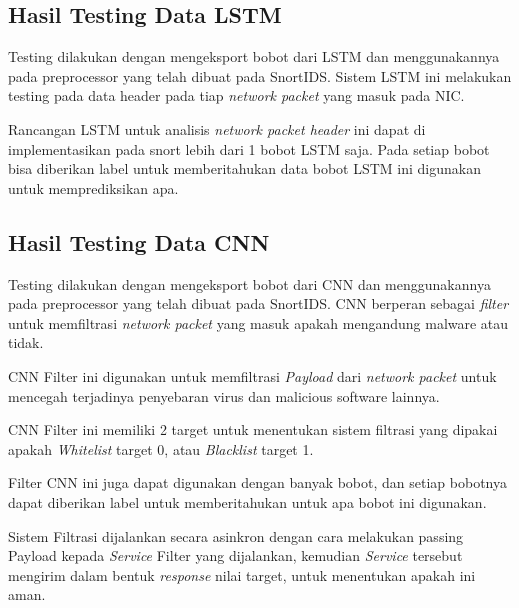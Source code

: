 \documentclass[./skripsi.tex]{subfiles}
\begin{document}
\subsection{Hasil Testing Data LSTM}
\par Testing dilakukan dengan mengeksport bobot dari LSTM dan menggunakannya pada preprocessor yang telah dibuat pada SnortIDS.
Sistem LSTM ini melakukan testing pada data header pada tiap \textit{network packet} yang masuk pada NIC.
\par Rancangan LSTM untuk analisis \textit{network packet header} ini dapat di implementasikan pada snort lebih dari 1 bobot LSTM saja. Pada setiap bobot bisa diberikan label untuk memberitahukan data bobot LSTM ini digunakan untuk memprediksikan apa.
\subsection{Hasil Testing Data CNN}
\par Testing dilakukan dengan mengeksport bobot dari CNN dan menggunakannya pada preprocessor yang telah dibuat pada SnortIDS. CNN berperan sebagai \textit{filter} untuk memfiltrasi \textit{network packet} yang masuk apakah mengandung malware atau tidak.
\par CNN Filter ini digunakan untuk memfiltrasi \textit{Payload} dari \textit{network packet} untuk mencegah terjadinya penyebaran virus dan malicious software lainnya.
\par CNN Filter ini memiliki 2 target untuk menentukan sistem filtrasi yang dipakai apakah \textit{Whitelist} target 0, atau \textit{Blacklist} target 1.
\par Filter CNN ini juga dapat digunakan dengan banyak bobot, dan setiap bobotnya dapat diberikan label untuk memberitahukan untuk apa bobot ini digunakan.
\par Sistem Filtrasi dijalankan secara asinkron dengan cara melakukan passing Payload kepada \textit{Service} Filter yang dijalankan, kemudian \textit{Service} tersebut mengirim dalam bentuk \textit{response} nilai target, untuk menentukan apakah  ini aman.
\end{document}
